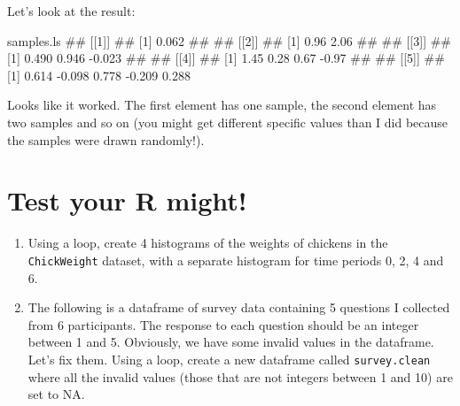 \documentclass[]{book}
\newenvironment{Shaded}{\begin{snugshade}}{\end{snugshade}}
\newcommand{\NormalTok}[1]{#1}
\theoremstyle{definition}
\theoremstyle{definition}
\theoremstyle{remark}
\begin{document}
Let's look at the result:

\begin{Shaded}
\begin{Highlighting}[]
\NormalTok{samples.ls}
\NormalTok{## [[1]]}
\NormalTok{## [1] 0.062}
\NormalTok{## }
\NormalTok{## [[2]]}
\NormalTok{## [1] 0.96 2.06}
\NormalTok{## }
\NormalTok{## [[3]]}
\NormalTok{## [1]  0.490  0.946 -0.023}
\NormalTok{## }
\NormalTok{## [[4]]}
\NormalTok{## [1]  1.45  0.28  0.67 -0.97}
\NormalTok{## }
\NormalTok{## [[5]]}
\NormalTok{## [1]  0.614 -0.098  0.778 -0.209  0.288}
\end{Highlighting}
\end{Shaded}

Looks like it worked. The first element has one sample, the second
element has two samples and so on (you might get different specific
values than I did because the samples were drawn randomly!).

\section{Test your R might!}\label{test-your-r-might-7}

\begin{enumerate}
\def\labelenumi{\arabic{enumi}.}
\item
  Using a loop, create 4 histograms of the weights of chickens in the
  \texttt{ChickWeight} dataset, with a separate histogram for time
  periods 0, 2, 4 and 6.
\item
  The following is a dataframe of survey data containing 5 questions I
  collected from 6 participants. The response to each question should be
  an integer between 1 and 5. Obviously, we have some invalid values in
  the dataframe. Let's fix them. Using a loop, create a new dataframe
  called \texttt{survey.clean} where all the invalid values (those that
  are not integers between 1 and 10) are set to NA.
\end{enumerate}
\end{document}

